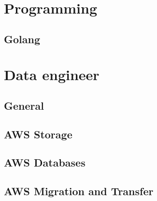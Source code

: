 \documentclass{book}
\begin{document}
\tableofcontents

\chapter{Programming}
\section{Golang}



\chapter{Data engineer}
\section{General}

\newpage
\section{AWS Storage}

\newpage
\section{AWS Databases}

\newpage
\section{AWS Migration and Transfer}

\newpage
\end{document}
